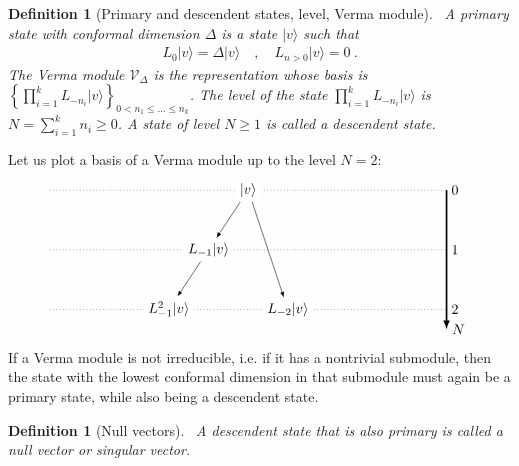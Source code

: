 \documentclass[12pt, a4paper]{article}
\theoremstyle{break}
\newtheorem{defn}[exo]{Definition}
\begin{document}
\begin{defn}[Primary and descendent states, level, Verma module]
 ~\label{def:prim}
 A primary state with conformal dimension $\Delta$ is a state $|v\rangle$ such that 
 \begin{align}
  L_0 |v\rangle = \Delta |v\rangle \quad , \quad L_{n>0} |v\rangle = 0\ .
 \end{align}
 The Verma module $\mathcal V_\Delta$ is the representation whose basis is 
 $
 \left\{ \prod_{i=1}^k L_{-n_i} |v\rangle\right\}_{ 0<n_1\leq \dots \leq n_k}
 $.
The level of the state $\prod_{i=1}^k L_{-n_i} |v\rangle $ is $N=\sum_{i=1}^k n_i\geq 0$. A state of level $N\geq 1$ is called a descendent state.
\end{defn}
Let us plot a basis of a Verma module up to the level $N=2$:
\begin{align}
 \begin{tikzpicture}[scale = .25, baseline=(current  bounding  box.center)]
  \draw[-latex, very thick] (20, 0) -- (20, -14) node [right] {$N$};
  \foreach \x in {0, ..., 2}
  {
  \draw [dotted] (-20, {-6*\x}) -- (20, {-6*\x}) node [right] {${\x}$};
  }
  \node[fill = white] at (0, 0) (0) {$|v\rangle$};
  \node[fill = white] at (-4,-6) (1) {$L_{-1}|v\rangle$};
  \node[fill = white] at (-8, -12) (11) {$L_{-1}^2|v\rangle$};
  \node[fill = white] at (4,-12) (2) {$L_{-2}|v\rangle$};
  \draw[-latex] (0) -- (1);
  \draw[-latex] (1) -- (11);
  \draw[-latex] (0) -- (2);
 \end{tikzpicture}
\end{align}
If a Verma module is not irreducible, i.e. if it has a nontrivial submodule, then the state with the lowest conformal dimension in that submodule must again be a primary state, while also being a descendent state.

\begin{defn}[Null vectors]
 ~\label{def:nv}
 A descendent state that is also primary is called a null vector or singular vector.
\end{defn}
\end{document}
